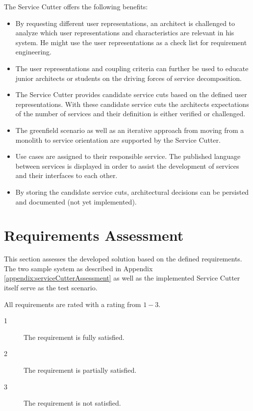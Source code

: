 The Service Cutter offers the following benefits:

\begin{itemize}
	\item By requesting different user representations, an architect is challenged to analyze which user representations and characteristics are relevant in his system. He might use the user representations as a check list for requirement engineering.
	\item The user representations and coupling criteria can further be used to educate junior architects or students on the driving forces of service decomposition.
	\item The Service Cutter provides candidate service cuts based on the defined user representations. With these candidate service cuts the architects expectations of the number of services and their definition is either verified or challenged. 
	\item The greenfield scenario as well as an iterative approach from moving from a monolith to service orientation are supported by the Service Cutter.
	\item Use cases are assigned to their responsible service. The published language between services is displayed in order to assist the development of services and their interfaces to each other.
	\item By storing the candidate service cuts, architectural decisions can be persisted and documented (not yet implemented).
\end{itemize}

\section{Requirements Assessment}

This section assesses the developed solution based on the defined requirements. The two sample system as described in Appendix \ref{appendix:serviceCutterAssessment} as well as the implemented Service Cutter itself serve as the test scenario.

All requirements are rated with a rating from $1-3$.

\begin{description}
\item[1] The requirement is fully satisfied.
\item[2] The requirement is partially satisfied.
\item[3] The requirement is not satisfied.
\end{description}

